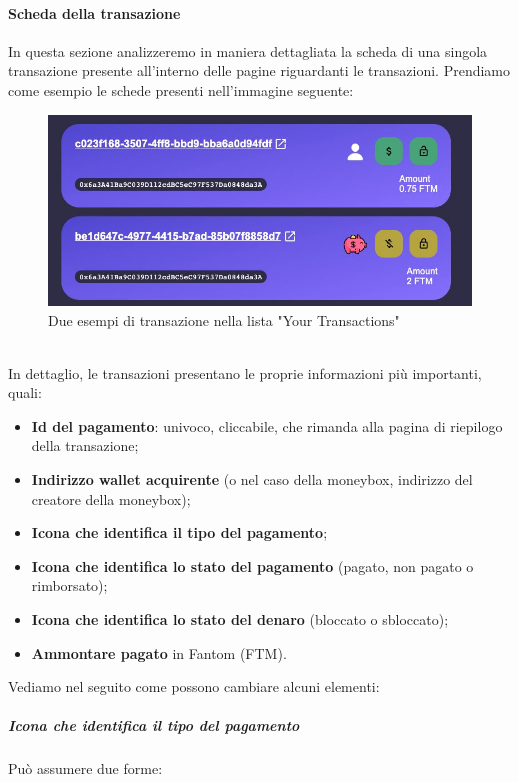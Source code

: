         \paragraph{Scheda della transazione}
        In questa sezione analizzeremo in maniera dettagliata la scheda di una singola transazione presente all'interno delle pagine riguardanti le transazioni.
        Prendiamo come esempio le schede presenti nell'immagine seguente:
        \begin{figure}[H]
            \centering
            \includegraphics[scale=0.4]{immagini/Transaction/transactionsmall.jpg}
            \caption{Due esempi di transazione nella lista "Your Transactions"}
        \end{figure}
        \textbf{}\\
        In dettaglio, le transazioni presentano le proprie informazioni più importanti, quali:
        \begin{itemize}
             \item \textbf{Id del pagamento}: univoco, cliccabile, che rimanda alla pagina di riepilogo della transazione;
            \item \textbf{Indirizzo wallet acquirente} (o nel caso della moneybox, indirizzo del creatore della moneybox);
            \item \textbf{Icona che identifica il tipo del pagamento};
            \item \textbf{Icona che identifica lo stato del pagamento} (pagato, non pagato o rimborsato);
            \item \textbf{Icona che identifica lo stato del denaro} (bloccato o sbloccato);
            \item \textbf{Ammontare pagato} in Fantom\glo{} (FTM\glo{}).
        \end{itemize}
        Vediamo nel seguito come possono cambiare alcuni elementi:
            \subparagraph{Icona che identifica il tipo del pagamento}
            Può assumere due forme:
